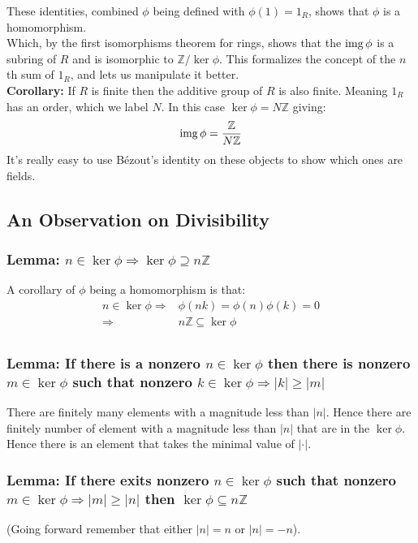 These identities,
combined $\phi$ being defined with $\phi(1)=1_R$,
shows that $\phi$ is a homomorphism.
\\

Which, 
by the first isomorphisms theorem for rings,
shows that the $\operatorname{img}\phi$ is a subring of $R$ and is isomorphic to $\mathbb{Z}/\ker \phi$.
This formalizes the concept of the $n$th sum of $1_R$,
and lets us manipulate it better.
\\

\textbf{Corollary:} If $R$ is finite then the additive group of $R$ is also finite.
Meaning $1_R$ has an order,
which we label $N$.
In this case $\ker\phi = N\mathbb{Z}$ giving:
\[\operatorname{img}\phi = \frac{\mathbb{Z}}{N\mathbb{Z}}\]
It's really easy to use Bézout's identity on these objects to show which ones are fields.

\subsection{An Observation on Divisibility}
\subsubsection{Lemma: $n\in\ker\phi \Rightarrow \ker\phi \supseteq n\mathbb{Z}$}
A corollary of $\phi$ being a homomorphism is that:
\begin{equation*}
\begin{aligned}
	n\in\ker\phi \Rightarrow& \phi(nk)=\phi(n)\phi(k) = 0\\
	\Rightarrow& n\mathbb{Z} \subseteq \ker\phi\\
\end{aligned}
\end{equation*}

\subsubsection{Lemma: If there is a nonzero $n\in\ker\phi$ then there is nonzero $m\in\ker\phi$ such that nonzero $k\in\ker\phi\Rightarrow|k|\geq|m|$}
There are finitely many elements with a magnitude less than $|n|$.
Hence there are finitely number of element with a magnitude less than $|n|$ that are in the $\ker\phi$.
Hence there is an element that takes the minimal value of $|\cdot|$.

\subsubsection{Lemma: If there exits nonzero $n\in\ker\phi$ such that nonzero $m\in\ker\phi\Rightarrow|m|\geq|n|$ then $\ker\phi \subseteq n\mathbb{Z}$}
(Going forward remember that either $|n| = n$ or $|n| = -n$).
\\

